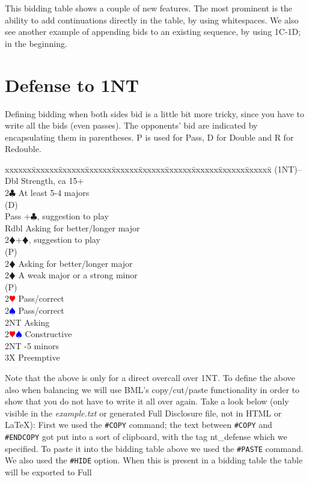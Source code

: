 \documentclass[a4paper]{article}
\newcommand{\BC}{\textcolor{OliveGreen}{$\clubsuit$}}
\newcommand{\BD}{\textcolor{RedOrange}{$\vardiamondsuit$}}
\newcommand{\BH}{\textcolor{Red}{$\varheartsuit${}}}
\newcommand{\BS}{\textcolor{Blue}{$\spadesuit${}}}
\newenvironment{bidtable}
{\begin{tabbing}

xxxxxx\=xxxxxx\=xxxxxx\=xxxxxx\=xxxxxx\=xxxxxx\=xxxxxx\=xxxxxx\=xxxxxx\=xxxxxx\=\kill}
{\end{tabbing} }%
\begin{document}
\bigbreak
This bidding table shows a couple of new features. The most
prominent is the ability to add continuations directly in the
table, by using whitespaces. We also see another example of
appending bids to an existing sequence, by using 1C-1D; in the
beginning.
\bigbreak
\section{Defense to 1NT}

Defining bidding when both sides bid is a little bit more tricky,
since you have to write all the bids (even passes). The opponents'
bid are indicated by encapsulating them in parentheses. P is used
for Pass, D for Double and R for Redouble.
\bigbreak
\begin{bidtable}
(1NT)--\+\\
Dbl \> Strength, ca 15+\\
2\BC \> At least 5-4 majors\+\\
(D)\+\\
Pass +\BC , suggestion to play\\
Rdbl \> Asking for better/longer major\\
2\BD {}+\BD , suggestion to play\-\\
(P)\+\\
2\BD \> Asking for better/longer major\-\-\\
2\BD \> A weak major or a strong minor\+\\
(P)\+\\
2\BH \> Pass/correct\\
2\BS \> Pass/correct\\
2NT \> Asking\-\-\\
2\BH\BS \> Constructive\\
2NT -5 minors\\
3X \> Preemptive\-
\end{bidtable}
\bigbreak
Note that the above is only for a direct overcall over 1NT. To
define the above also when balancing we will use BML's
copy/cut/paste functionality in order to show that you do not
have to write it all over again. Take a look below (only visible in
the \emph{example.txt} or generated Full Disclosure file, not in HTML or LaTeX):
\bigbreak
First we used the \texttt{\#COPY} command; the text between \texttt{\#COPY} and \texttt{\#ENDCOPY}
got put into a sort of clipboard, with the tag nt\_defense which we
specified. To paste it into the bidding table above we used
the \texttt{\#PASTE} command. We also used the \texttt{\#HIDE} option. When this is
present in a bidding table the table will be exported to Full
\end{document}

